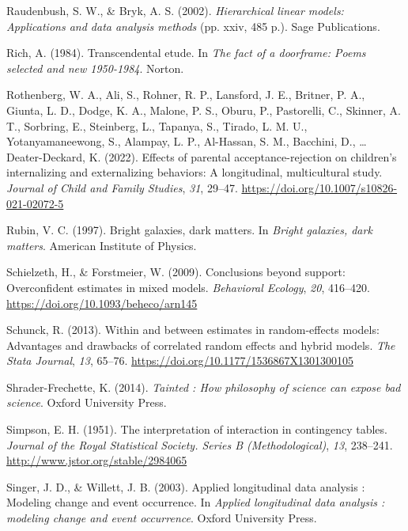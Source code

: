 \documentclass[
  letterpaper,
  DIV=11,
  numbers=noendperiod]{scrreprt}
\newlength{\cslhangindent}
\newlength{\cslentryspacingunit} %
\newenvironment{CSLReferences}[2] %
 {%
  \setlength{\parindent}{0pt}
  \ifodd #1
  \let\oldpar\par
  \def\par{\hangindent=\cslhangindent\oldpar}
  \fi
  \setlength{\parskip}{#2\cslentryspacingunit}
 }%
 {}
\begin{document}
\begin{CSLReferences}{1}{0}
\leavevmode{}%
Raudenbush, S. W., \& Bryk, A. S. (2002). \emph{Hierarchical linear
models: Applications and data analysis methods} (pp. xxiv, 485 p.). Sage
Publications.

\leavevmode{}%
Rich, A. (1984). Transcendental etude. In \emph{The fact of a doorframe:
Poems selected and new 1950-1984}. Norton.

\leavevmode{}%
Rothenberg, W. A., Ali, S., Rohner, R. P., Lansford, J. E., Britner, P.
A., Giunta, L. D., Dodge, K. A., Malone, P. S., Oburu, P., Pastorelli,
C., Skinner, A. T., Sorbring, E., Steinberg, L., Tapanya, S., Tirado, L.
M. U., Yotanyamaneewong, S., Alampay, L. P., Al-Hassan, S. M., Bacchini,
D., \ldots{} Deater-Deckard, K. (2022). Effects of parental
acceptance-rejection on children's internalizing and externalizing
behaviors: A longitudinal, multicultural study. \emph{Journal of Child
and Family Studies}, \emph{31}, 29--47.
\url{https://doi.org/10.1007/s10826-021-02072-5}

\leavevmode{}%
Rubin, V. C. (1997). Bright galaxies, dark matters. In \emph{Bright
galaxies, dark matters}. American Institute of Physics.

\leavevmode{}%
Schielzeth, H., \& Forstmeier, W. (2009). Conclusions beyond support:
Overconfident estimates in mixed models. \emph{Behavioral Ecology},
\emph{20}, 416--420. \url{https://doi.org/10.1093/beheco/arn145}

\leavevmode{}%
Schunck, R. (2013). Within and between estimates in random-effects
models: Advantages and drawbacks of correlated random effects and hybrid
models. \emph{The Stata Journal}, \emph{13}, 65--76.
\url{https://doi.org/10.1177/1536867X1301300105}

\leavevmode{}%
Shrader-Frechette, K. (2014). \emph{Tainted : How philosophy of science
can expose bad science}. Oxford University Press.

\leavevmode{}%
Simpson, E. H. (1951). The interpretation of interaction in contingency
tables. \emph{Journal of the Royal Statistical Society. Series B
(Methodological)}, \emph{13}, 238--241.
\url{http://www.jstor.org/stable/2984065}

\leavevmode{}%
Singer, J. D., \& Willett, J. B. (2003). Applied longitudinal data
analysis : Modeling change and event occurrence. In \emph{Applied
longitudinal data analysis : modeling change and event occurrence}.
Oxford University Press.


\end{CSLReferences}
\end{document}
